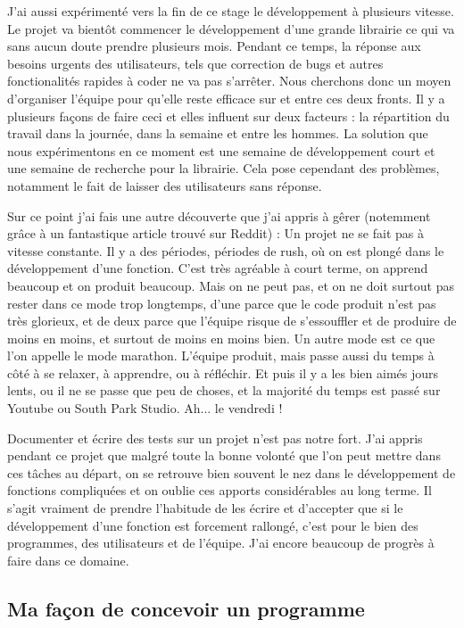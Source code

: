 J'ai aussi expérimenté vers la fin de ce stage le développement à plusieurs vitesse. Le projet va bientôt commencer le développement d'une grande librairie ce qui va sans aucun doute prendre plusieurs mois. Pendant ce temps, la réponse aux besoins urgents des utilisateurs, tels que correction de bugs et autres fonctionalités rapides à coder ne va pas s'arrêter. Nous cherchons donc un moyen d'organiser l'équipe pour qu'elle reste efficace sur et entre ces deux fronts. Il y a plusieurs façons de faire ceci et elles influent sur deux facteurs : la répartition du travail dans la journée, dans la semaine et entre les hommes. La solution que nous expérimentons en ce moment est une semaine de développement court et une semaine de recherche pour la librairie. Cela pose cependant des problèmes, notamment le fait de laisser des utilisateurs sans réponse.

Sur ce point j'ai fais une autre découverte que j'ai appris à gêrer (notemment grâce à un fantastique article trouvé sur Reddit)%
: Un projet ne se fait pas à vitesse constante. Il y a des périodes, périodes de rush, où on est plongé dans le développement d'une fonction. C'est très agréable à court terme, on apprend beaucoup et on produit beaucoup. Mais on ne peut pas, et on ne doit surtout pas rester dans ce mode trop longtemps, d'une parce que le code produit n'est pas très glorieux, et de deux parce que l'équipe risque de s'essouffler et de produire de moins en moins, et surtout de moins en moins bien. Un autre mode est ce que l'on appelle le mode marathon. L'équipe produit, mais passe aussi du temps à côté à se relaxer, à apprendre, ou à réfléchir. Et puis il y a les bien aimés jours lents, ou il ne se passe que peu de choses, et la majorité du temps est passé sur Youtube ou South Park Studio. Ah... le vendredi !

Documenter et écrire des tests sur un projet n'est pas notre fort. J'ai appris pendant ce projet que malgré toute la bonne volonté que l'on peut mettre dans ces tâches au départ, on se retrouve bien souvent le nez dans le développement de fonctions compliquées et on oublie ces apports considérables au long terme. Il s'agit vraiment de prendre l'habitude de les écrire et d'accepter que si le développement d'une fonction est forcement rallongé, c'est pour le bien des programmes, des utilisateurs et de l'équipe. J'ai encore beaucoup de progrès à faire dans ce domaine.

\subsection{Ma façon de concevoir un programme}

